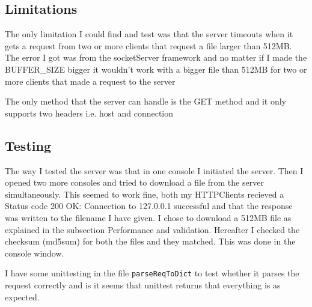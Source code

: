 \documentclass{sig-alternate-05-2015}
\begin{document}
\subsection{Limitations}
The only limitation I could find and test was that the server timeouts when it gets a request from two or more clients that request a file larger than 512MB. The error I got was from the socketServer framework and no matter if I made the BUFFER\_SIZE bigger it wouldn't work with a bigger file than 512MB for two or more clients that made a request to the server

The only method that the server can handle is the GET method and it only supports two headers i.e. host and connection

\subsection{Testing}
The way I tested the server was that in one console I initiated the server. Then I opened two more consoles and tried to download a file from the server simultaneously. This seemed to work fine, both my HTTPClients recieved a Status code 200 OK: Connection to 127.0.0.1 successful and that the response was written to the filename I have given.
I chose to download a 512MB file as explained in the subsection Performance and validation. Hereafter I checked the checksum (md5sum) for both the files and they matched. This was done in the console window.

I have some unittesting in the file \texttt{parseReqToDict} to test whether it parses the request correctly and is it seems that unittest returns that everything is as expected.

\newpage
\onecolumn
\appendix
\end{document}
